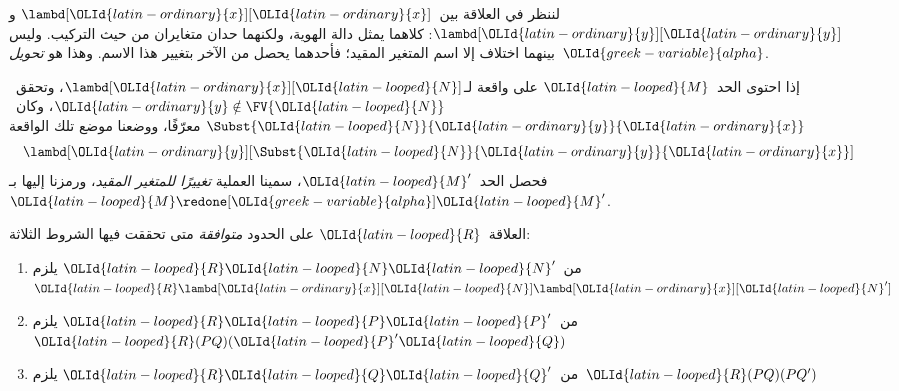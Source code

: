 \documentclass[../../../include/open-logic-section]{subfiles}
\begin{document}

لننظر في العلاقة بين~$\lambd[{\OLId{latin-ordinary}{x}}][{\OLId{latin-ordinary}{x}}]$ و$\lambd[{\OLId{latin-ordinary}{y}}][{\OLId{latin-ordinary}{y}}]$: كلاهما يمثل دالة الهوية،
ولكنهما حدان متغايران من حيث التركيب. وليس بينهما اختلاف إلا اسم المتغير المقيد؛
فأحدهما يحصل من الآخر بتغيير هذا الاسم. وهذا هو \emph{تحويل~${\OLId{greek-variable}{alpha}}$}.

\begin{defn}
  إذا احتوى الحد~${\OLId{latin-looped}{M}}$ على واقعة لـ$\lambd[{\OLId{latin-ordinary}{x}}][{\OLId{latin-looped}{N}}]$، وتحقق~${\OLId{latin-ordinary}{y}} \notin
  \FV{{\OLId{latin-looped}{N}}}$، وكان~$\Subst{{\OLId{latin-looped}{N}}}{{\OLId{latin-ordinary}{y}}}{{\OLId{latin-ordinary}{x}}}$ معرّفًا، ووضعنا موضع تلك الواقعة
  \begin{equation*}
    \lambd[{\OLId{latin-ordinary}{y}}][\Subst{{\OLId{latin-looped}{N}}}{{\OLId{latin-ordinary}{y}}}{{\OLId{latin-ordinary}{x}}}]
  \end{equation*}
  فحصل الحد~${\OLId{latin-looped}{M}}'$، سمينا العملية \emph{تغييرًا للمتغير المقيد}، ورمزنا إليها بـ
  ${\OLId{latin-looped}{M}} \redone[{\OLId{greek-variable}{alpha}}] {\OLId{latin-looped}{M}}'$.
\end{defn}

\begin{defn}
  العلاقة~${\OLId{latin-looped}{R}}$ على الحدود \emph{متوافقة} متى تحققت فيها الشروط الثلاثة:
  \begin{enumerate}
  \item من~${\OLId{latin-looped}{R}} {\OLId{latin-looped}{N}} {\OLId{latin-looped}{N}}'$ يلزم~${\OLId{latin-looped}{R}} \lambd[{\OLId{latin-ordinary}{x}}][{\OLId{latin-looped}{N}}] \lambd[{\OLId{latin-ordinary}{x}}][{\OLId{latin-looped}{N}}']$
  \item من~${\OLId{latin-looped}{R}} {\OLId{latin-looped}{P}} {\OLId{latin-looped}{P}}'$ يلزم~${\OLId{latin-looped}{R}} (PQ) ({\OLId{latin-looped}{P}}'{\OLId{latin-looped}{Q}})$
  \item من~${\OLId{latin-looped}{R}} {\OLId{latin-looped}{Q}} {\OLId{latin-looped}{Q}}'$ يلزم~${\OLId{latin-looped}{R}} (PQ) (PQ')$
  \end{enumerate}
\end{defn}
\end{document}
